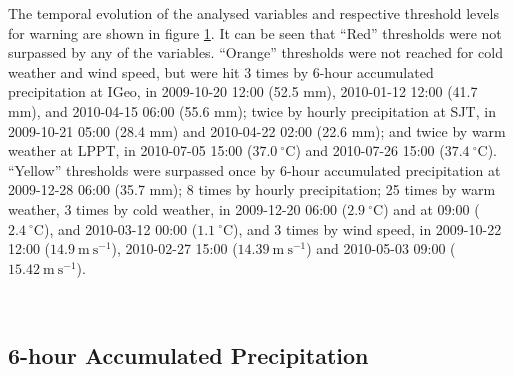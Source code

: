 The temporal evolution of the analysed variables and respective threshold levels for warning are shown in figure \ref{fig:ts}. It can be seen that “Red” thresholds were not surpassed by any of the variables. “Orange” thresholds were not reached for cold weather and wind speed, but were hit 3 times by 6-hour accumulated precipitation at IGeo, in 2009-10-20 12:00 (52.5 mm), 2010-01-12 12:00 (41.7 mm), and 2010-04-15 06:00 (55.6 mm); twice by hourly precipitation at SJT, in 2009-10-21 05:00 (28.4 mm) and 2010-04-22 02:00 (22.6 mm); and twice by warm weather at LPPT, in 2010-07-05 15:00 ($37.0\mathrm{\ ^{\circ}C}$) and 2010-07-26 15:00 ($37.4\mathrm{\ ^{\circ}C}$).  “Yellow” thresholds were surpassed once by 6-hour accumulated precipitation at 2009-12-28 06:00 (35.7 mm); 8 times by hourly precipitation; 25 times by warm weather, 3 times by cold weather,  in 2009-12-20 06:00 ($2.9\mathrm{\ ^{\circ}C}$) and at 09:00 ($2.4\mathrm{\ ^{\circ}C}$), and 2010-03-12 00:00 ($1.1\mathrm{\ ^{\circ}C}$), and 3 times by wind speed, in 2009-10-22 12:00 ($14.9\mathrm{\ m\ s^{-1}}$), 2010-02-27 15:00 ($14.39\mathrm{\ m\ s^{-1}}$) and 2010-05-03 09:00 ($15.42\mathrm{\ m\ s^{-1}}$).

\begin{figure}[!htp]
    \centering
    \\
    \label{fig:ts}
\end{figure}

\FloatBarrier
\subsection{6-hour Accumulated Precipitation}

